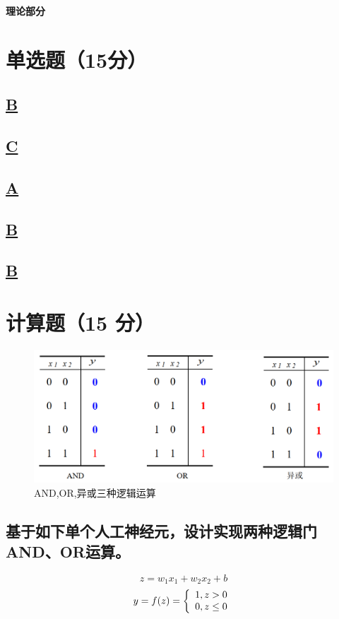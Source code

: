 \documentclass[a4paper]{article}
\begin{document}
\courseheader
{}
\vspace{3mm}
\centerline{\textbf{\Large{理论部分}}}

\section{单选题（15分）}
\subsection {\underline{B}}

\subsection {\underline{C}}

\subsection {\underline{A}}

\subsection {\underline{B}}

\subsection {\underline{B}}

\section{计算题（15 分）}

\begin{figure}[h]
    \centering
    \includegraphics[width=12cm]{Fig1.png}
    \caption{AND,OR,异或三种逻辑运算}
    \label{fig:label_1}
\end{figure}

\subsection{基于如下单个人工神经元，设计实现两种逻辑门AND、OR运算。}
\setlength{\parindent}{2em}
\begin{equation}
    z=w_1x_1 +w_2x_2 + b
\end{equation}
\begin{equation}
y=f(z)=\left\{
        \begin{array}{l r}
        1, z > 0 \\
        0, z \leq 0
        \end{array}
\right.
\end{equation}
\end{document}
